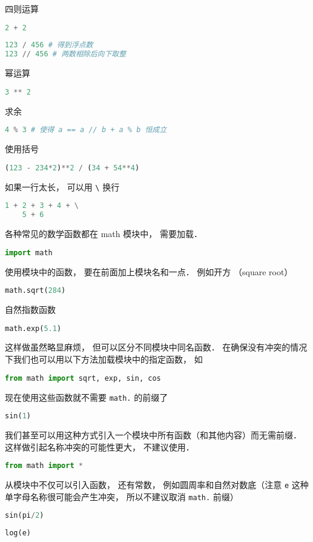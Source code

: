 四则运算
\begin{lstlisting}[language=python]
2 + 2
\end{lstlisting}
\begin{lstlisting}[language=python]
123 / 456 # 得到浮点数
123 // 456 # 两数相除后向下取整
\end{lstlisting}
幂运算
\begin{lstlisting}[language=python]
3 ** 2
\end{lstlisting}
求余
\begin{lstlisting}[language=python]
4 % 3 # 使得 a == a // b + a % b 恒成立
\end{lstlisting}
使用括号
\begin{lstlisting}[language=python]
(123 - 234*2)**2 / (34 + 54**4)
\end{lstlisting}
如果一行太长， 可以用 \verb|\| 换行
\begin{lstlisting}[language=python]
1 + 2 + 3 + 4 + \
    5 + 6
\end{lstlisting}
各种常见的数学函数都在 math 模块中， 需要加载．
\begin{lstlisting}[language=python]
import math
\end{lstlisting}
使用模块中的函数， 要在前面加上模块名和一点． 例如开方 （square root）
\begin{lstlisting}[language=python]
math.sqrt(284)
\end{lstlisting}
自然指数函数
\begin{lstlisting}[language=python]
math.exp(5.1)
\end{lstlisting}
这样做虽然略显麻烦， 但可以区分不同模块中同名函数． 在确保没有冲突的情况下我们也可以用以下方法加载模块中的指定函数， 如
\begin{lstlisting}[language=python]
from math import sqrt, exp, sin, cos
\end{lstlisting}
现在使用这些函数就不需要 \verb|math.| 的前缀了
\begin{lstlisting}[language=python]
sin(1)
\end{lstlisting}
我们甚至可以用这种方式引入一个模块中所有函数（和其他内容）而无需前缀． 这样做引起名称冲突的可能性更大， 不建议使用．
\begin{lstlisting}[language=python]
from math import *
\end{lstlisting}
从模块中不仅可以引入函数， 还有常数， 例如圆周率和自然对数底（注意 \verb|e| 这种单字母名称很可能会产生冲突， 所以不建议取消 \verb|math.| 前缀）
\begin{lstlisting}[language=python]
sin(pi/2)
\end{lstlisting}
\begin{lstlisting}[language=python]
log(e)
\end{lstlisting}

